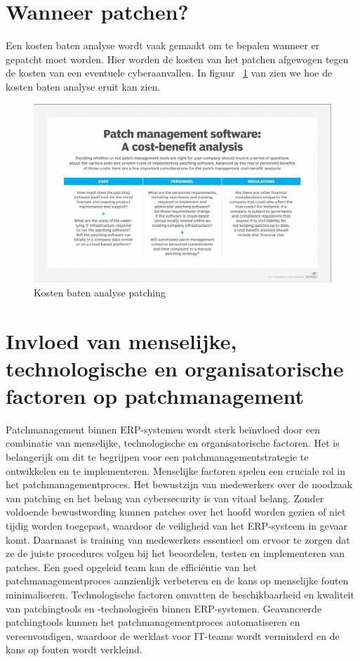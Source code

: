 \section{Wanneer patchen?}
Een kosten baten analyse wordt vaak gemaakt om te bepalen wanneer er gepatcht moet worden. Hier worden de kosten van het patchen afgewogen tegen de kosten van een eventuele cyberaanvallen.
In figuur ~\ref{fig:kostenbaten} van \textcite{Posey2024} zien we hoe de kosten baten analyse eruit kan zien.

\begin{figure}[h]
    \centering
    \includegraphics[width=\textwidth]{techtarget.jpg}
    \caption{Kosten baten analyse patching \autocite{Posey2024}}
    \label{fig:kostenbaten}
\end{figure}

\newpage

\section{Invloed van menselijke, technologische en organisatorische factoren op patchmanagement}

Patchmanagement binnen ERP-systemen wordt sterk beïnvloed door een combinatie van menselijke, technologische en organisatorische factoren. Het is belangerijk om dit te begrijpen voor een patchmanagementstrategie te ontwikkelen en te implementeren. Menselijke 
factoren spelen een cruciale rol in het patchmanagementproces. Het bewustzijn van medewerkers over de noodzaak van patching en het belang van cybersecurity
is van vitaal belang. Zonder voldoende bewustwording kunnen patches over het hoofd worden gezien of niet tijdig worden toegepast, waardoor de veiligheid van het ERP-systeem in gevaar komt. Daarnaast 
is training van medewerkers essentieel om ervoor te zorgen dat ze de juiste procedures volgen bij het beoordelen, testen en implementeren van patches. 
Een goed opgeleid team kan de efficiëntie van het patchmanagementproces aanzienlijk verbeteren en de kans op menselijke fouten minimaliseren. Technologische 
factoren omvatten de beschikbaarheid en kwaliteit van patchingtools en -technologieën binnen ERP-systemen. Geavanceerde
patchingtools kunnen het patchmanagementproces automatiseren en vereenvoudigen, waardoor de werklast voor IT-teams wordt verminderd en de kans op fouten wordt verkleind. 

